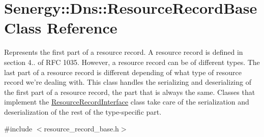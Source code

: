 \hypertarget{class_senergy_1_1_dns_1_1_resource_record_base}{\section{Senergy\-:\-:Dns\-:\-:Resource\-Record\-Base Class Reference}
\label{class_senergy_1_1_dns_1_1_resource_record_base}
}


Represents the first part of a resource record. A resource record is defined in section 4.. of R\-F\-C 1035. However, a resource record can be of different types. The last part of a resource record is different depending of what type of resource record we're dealing with. This class handles the serializing and deserializing of the first part of a resource record, the part that is always the same. Classes that implement the \hyperlink{class_senergy_1_1_dns_1_1_resource_record_interface}{Resource\-Record\-Interface} class take care of the serialization and deserialization of the rest of the type-\/specific part.  




{\ttfamily \#include $<$resource\-\_\-record\-\_\-base.\-h$>$}

